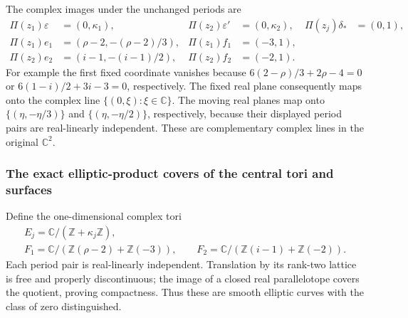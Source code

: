 The complex images under the unchanged periods are
\[
\begin{aligned}
 \Pi(z_1)\varepsilon&=(0,\kappa_1),&
 \Pi(z_2)\varepsilon'&=(0,\kappa_2),&
 \Pi(z_j)\delta_*&=(0,1),\\
 \Pi(z_1)e_1&=(\rho-2,-(\rho-2)/3),&
 \Pi(z_1)f_1&=(-3,1),\\
 \Pi(z_2)e_2&=(i-1,-(i-1)/2),&
 \Pi(z_2)f_2&=(-2,1).
\end{aligned}
\tag{FF10}\label{ffcert:eq:complex-images}
\]
For example the first fixed coordinate vanishes because
$6(2-\rho)/3+2\rho-4=0$ or $6(1-i)/2+3i-3=0$, respectively.
The fixed real plane consequently maps onto the complex line
$\{(0,\xi):\xi\in\mathbb C\}$. The moving real planes map onto
$\{(\eta,-\eta/3)\}$ and $\{(\eta,-\eta/2)\}$, respectively,
because their displayed period pairs are real-linearly independent.
These are complementary complex lines in the original $\mathbb C^2$.

\subsubsection{The exact elliptic-product covers of the central tori and surfaces}

Define the one-dimensional complex tori
\[
\begin{gathered}
 E_j=\mathbb C/(\mathbb Z+\kappa_j\mathbb Z),\\
 F_1=\mathbb C/(\mathbb Z(\rho-2)+\mathbb Z(-3)),\qquad
 F_2=\mathbb C/(\mathbb Z(i-1)+\mathbb Z(-2)).
\end{gathered}
\tag{FF11}\label{ffcert:eq:elliptic-factors}
\]
Each period pair is real-linearly independent. Translation by its rank-two
lattice is free and properly discontinuous; the image of a closed real
parallelotope covers the quotient, proving compactness. Thus these are
smooth elliptic curves with the class of zero distinguished.

